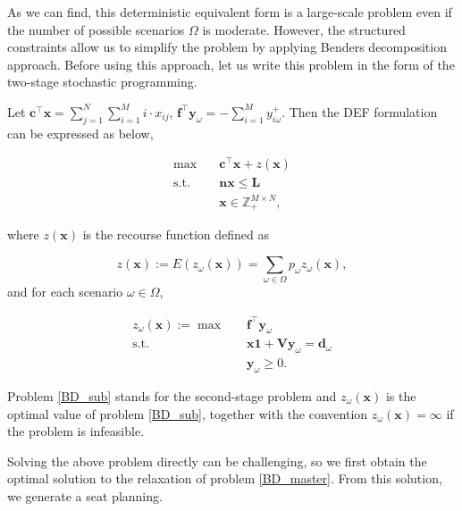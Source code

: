 As we can find, this deterministic equivalent form is a large-scale problem even if the number of possible scenarios $\Omega$ is moderate. However, the structured constraints allow us to simplify the problem by applying Benders decomposition approach. Before using this approach, let us write this problem in the form of the two-stage stochastic programming.

Let $\mathbf{c}^{\intercal}\mathbf{x} = \sum_{j =1}^{N} \sum_{i=1}^M i \cdot x_{ij}$, $\mathbf{f}^{\intercal}\mathbf{y}_{\omega} = -\sum_{i=1}^{M} y_{i \omega}^{+}$. Then the DEF formulation can be expressed as below,

\begin{equation}\label{BD_master}
  \begin{aligned}
\max \quad & \mathbf{c}^{\intercal} \mathbf{x}+ z(\mathbf{x}) \\
\text {s.t.} \quad & \mathbf{n} \mathbf{x} \leq \mathbf{L} \\
& \mathbf{x} \in \mathbb{Z}_{+}^{M \times N},
\end{aligned}
\end{equation}

where $z(\mathbf{x})$ is the recourse function defined as 

$$z(\mathbf{x}) := E(z_{\omega}(\mathbf{x})) = \sum_{\omega \in \Omega} p_{\omega} z_{\omega}(\mathbf{x}),$$ and for each scenario $\omega \in \Omega$, 

\begin{equation}\label{BD_sub}
  \begin{aligned}
    z_{\omega}(\mathbf{x}) := \max \quad & \mathbf{f}^{\intercal} \mathbf{y}_{\omega} \\
    \text {s.t.} \quad & \mathbf{x} \mathbf{1} + \mathbf{V} \mathbf{y}_{\omega} = \mathbf{d}_{\omega} \\
     & \mathbf{y}_{\omega} \geq 0.
  \end{aligned}
  \end{equation}

Problem \eqref{BD_sub} stands for the second-stage problem and $z_{\omega}(\mathbf{x})$ is the optimal value of problem \eqref{BD_sub}, together with the convention $z_{\omega}(\mathbf{x}) = \infty$ if the problem is infeasible.

Solving the above problem directly can be challenging, so we first obtain the optimal solution to the relaxation of problem \eqref{BD_master}. From this solution, we generate a seat planning.

